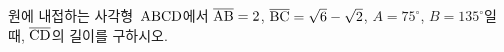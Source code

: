 원에 내접하는 사각형~$\mathrm{ABCD}$에서 $\overline{\mathrm{AB}}=2$, $\overline{\mathrm{BC}}=\sqrt{6}-\sqrt{2}$, $A=75^\circ$, $B=135^\circ$일 때, $\overline{\mathrm{CD}}$의 길이를 구하시오.
